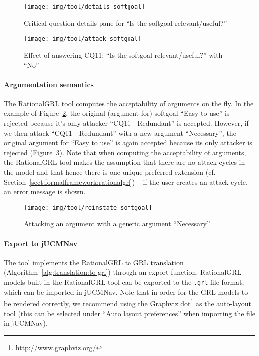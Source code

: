 \begin{figure}[t]
\centering
\texttt{[image: img/tool/details\_softgoal]}
\caption{Critical question details pane for ``Is the softgoal relevant/useful?''}
\label{fig:tool:cqdetails}
\end{figure}

\begin{figure}[b]
\centering
\texttt{[image: img/tool/attack\_softgoal]}
\caption{Effect of answering CQ11: ``Is the softgoal relevant/useful?'' with ``No''}
\label{fig:tool:cqeffect}
\end{figure}

\paragraph{Argumentation semantics} The RationalGRL tool computes the acceptability of arguments on the fly. In the example of Figure~\ref{fig:tool:cqeffect}, the original (argument for) softgoal ``Easy to use'' is rejected because it's only attacker ``CQ11 - Redundant'' is accepted. However, if we then attack ``CQ11 - Redundant'' with a new argument ``Necessary'', the original argument for ``Easy to use'' is again accepted because its only attacker is rejected  (Figure~\ref{fig:tool:argument}). Note that when computing the acceptability of arguments, the RationalGRL tool makes the assumption that there are no attack cycles in the model and that hence there is one unique preferred extension (cf. Section~\ref{sect:formalframework:rationalgrl}) -- if the user creates an attack cycle, an error message is shown. 

\begin{figure}[t]
\centering
\texttt{[image: img/tool/reinstate\_softgoal]}
\caption{Attacking an argument with a generic argument ``Necessary''}
\label{fig:tool:argument}
\end{figure}

\paragraph{Export to jUCMNav} The tool implements the RationalGRL to GRL translation (Algorithm~\ref{alg:translation:to-grl}) through an export function. RationalGRL models built in the RationalGRL tool can be exported to the \texttt{.grl} file format, which can be imported in jUCMNav. Note that in order for the GRL models to be rendered correctly, we recommend using the Graphviz dot\footnote{\url{http://www.graphviz.org/}} as the auto-layout tool (this can be selected under ``Auto layout preferences'' when importing the file in jUCMNav).

